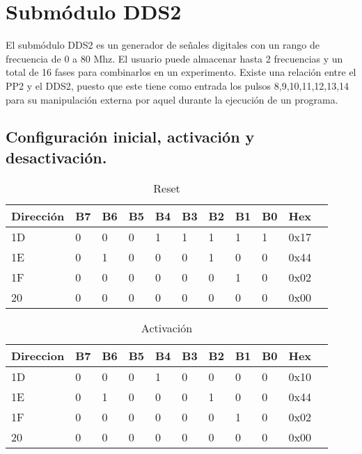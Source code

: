 \section{Subm\'odulo DDS2}

El subm\'odulo DDS2 es un generador de se\~nales digitales con un rango de frecuencia de 0 a 80 Mhz.
El usuario puede almacenar hasta 2 frecuencias y un total de 16 fases para 
combinarlos en un experimento.
Existe una relaci\'on entre el PP2 y el DDS2, puesto que este tiene como entrada
los pulsos 8,9,10,11,12,13,14 para su manipulaci\'on externa por aquel durante
la ejecuci\'on de un programa.

\subsection{Configuraci\'on inicial, activaci\'on y desactivaci\'on.}

\begin{table}[ht]
    \centering
    \begin{tabular}{|l|l|l|l|l|l|l|l|l|l|l|}
    \hline
    Direcci\'on  &B7 & B6 & B5 & B4& B3 & B2& B1 & B0 &Hex\\
    \hline
    1D  &0 & 0 & 0 & 1& 1 & 1& 1 & 1 &0x17\\
    \hline
    1E  &0 & 1 & 0 & 0& 0 & 1& 0 & 0 &0x44\\
    \hline
    1F  &0 & 0 & 0 & 0& 0 & 0& 1 & 0 & 0x02\\
    \hline
    20  &0 & 0 & 0 & 0 & 0 & 0& 0 & 0&0x00 \\
    \hline
    \end{tabular}
    \caption{\label{tab:dds2_config_inicial}Reset}
    \end{table}

    \begin{table}[ht]
    \centering
    \begin{tabular}{|l|l|l|l|l|l|l|l|l|l|l|}
    \hline
    Direccion  &B7 & B6 & B5 & B4& B3 & B2& B1 & B0 &Hex\\
    \hline
    1D  &0 & 0 & 0 & 1& 0 & 0& 0 & 0 &0x10\\
    \hline
    1E  &0 & 1 & 0 & 0& 0 & 1& 0 & 0 &0x44\\
    \hline
    1F  &0 & 0 & 0 & 0& 0 & 0& 1 & 0 & 0x02\\
    \hline
    20  &0 & 0 & 0 & 0 & 0 & 0& 0 & 0&0x00 \\
    \hline
    \end{tabular}
    \caption{\label{tab:dds2_activate}Activaci\'on}
    \end{table}
    
